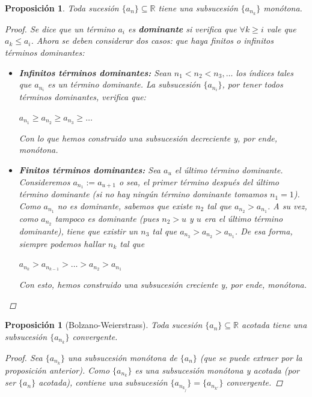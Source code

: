 \documentclass[]{article}
\newtheorem{prop}[teo]{Proposición}
\def\R{\mathbb{R}}
\begin{document}
\begin{prop}
	Toda sucesión $\{a_n\} \subseteq \R$ tiene una subsucesión $\{a_{n_k}\}$ monótona.
	\begin{proof}
		Se dice que un término $a_i$ es \textbf{dominante} si verifica que $\forall k \geq i$ vale que $a_k \leq a_i$. Ahora se deben considerar dos casos: que haya finitos o infinitos términos dominantes:
		\begin{itemize}
			\item \textbf{Infinitos términos dominantes:} Sean $n_1 < n_2 < n_3, \hdots$ los índices tales que $a_{n_i}$ es un término dominante. La subsucesión $\{a_{n_i}\}$, por tener todos términos dominantes, verifica que: 
			\begin{center}
				$a_{n_1} \geq a_{n_2} \geq a_{n_3} \geq \hdots $
			\end{center}
			Con lo que hemos construido una subsucesión decreciente y, por ende, monótona.
			\item \textbf{Finitos términos dominantes:} Sea $a_u$ el último término dominante. Consideremos $a_{n_1} := a_{u+1}$ o sea, el primer término después del último término dominante (si no hay ningún término dominante tomamos $n_1 = 1$). Como $a_{n_1}$ no es dominante, sabemos que existe $n_2$ tal que $a_{n_2} > a_{n_1}$. A su vez, como $a_{n_2}$ tampoco es dominante (pues $n_2 > u$ y $u$ era el último término dominante), tiene que existir un $n_3$ tal que $a_{n_3}  > a_{n_2} > a_{n_1}$. De esa forma, siempre podemos hallar $n_k$ tal que
			\begin{center}
				$a_{n_k} > a_{n_{k-1}} > \hdots > a_{n_2} > a_{n_1}$
			\end{center}
			Con esto, hemos construido una subsucesión creciente y, por ende, monótona.
		\end{itemize}
	\end{proof}
\end{prop}

\begin{prop}[Bolzano-Weierstrass]
	Toda sucesión $\{a_n\} \subseteq \R$ acotada tiene una subsucesión $\{a_{n_k}\}$ convergente.
	\begin{proof}
		Sea $\{a_{n_k}\}$ una subsucesión monótona de $\{a_{n}\}$ (que se puede extraer por la proposición anterior). Como $\{a_{n_k}\}$ es una subsucesión monótona y acotada (por ser $\{a_{n}\}$ acotada), contiene una subsucesión $\{a_{n_{k_j}}\} = \{a_{n_{k'}}\}$ convergente.
	\end{proof}
\end{prop}
\end{document}
